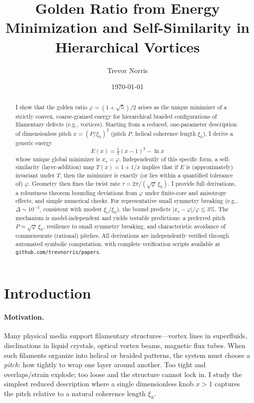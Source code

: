 \documentclass[11pt]{article}
\title{Golden Ratio from Energy Minimization and Self-Similarity in Hierarchical Vortices}
\author{Trevor Norris}
\date{\small \today}
\theoremstyle{remark}
\theoremstyle{definition}
\newcommand{\ph}{\varphi}
\begin{document}
\maketitle

\begin{abstract}
I show that the golden ratio $\ph=(1+\sqrt5)/2$ arises as the unique minimizer of a strictly convex, coarse-grained energy for hierarchical braided configurations of filamentary defects (e.g., vortices). Starting from a reduced, one-parameter description of dimensionless pitch $x=(P/\xi_h)^2$ (pitch $P$, helical coherence length $\xi_h$), I derive a generic energy
\[
E(x)=\tfrac12(x-1)^2-\ln x
\]
whose unique global minimizer is $x_\star=\ph$. Independently of this specific form, a self-similarity (layer-addition) map $T(x)=1+1/x$ implies that if $E$ is (approximately) invariant under $T$, then the minimizer is exactly (or lies within a quantified tolerance of) $\ph$. Geometry then fixes the twist rate $\tau=2\pi/(\sqrt{\ph}\,\xi_h)$. I provide full derivations, a robustness theorem bounding deviations from $\ph$ under finite-core and anisotropy effects, and simple numerical checks. For representative small symmetry breaking (e.g., $\Delta\sim10^{-3}$, consistent with modest $\xi_c/\xi_h$), the bound predicts $|x_\star-\ph|/\ph\lesssim 3\%$. The mechanism is model-independent and yields testable predictions: a preferred pitch $P\simeq\sqrt{\ph}\,\xi_h$, resilience to small symmetry breaking, and characteristic avoidance of commensurate (rational) pitches. All derivations are independently verified through automated symbolic computation, with complete verification scripts available at \texttt{github.com/trevnorris/papers}.
\end{abstract}

\section{Introduction}
\paragraph{Motivation.} Many physical media support filamentary structures---vortex lines in superfluids, disclinations in liquid crystals, optical vortex beams, magnetic flux tubes. When such filaments organize into helical or braided patterns, the system must choose a \emph{pitch}: how tightly to wrap one layer around another. Too tight and overlaps/strain explode; too loose and the structure cannot lock in. I study the simplest reduced description where a single dimensionless knob $x>1$ captures the pitch relative to a natural coherence length $\xi_h$.
\end{document}
